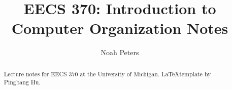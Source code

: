\documentclass[a4paper]{report}
\author{Noah Peters}
\title{EECS 370: Introduction to Computer Organization Notes}
\begin{document}
\maketitle

\begin{abstract}
	Lecture notes for EECS 370 at the University of Michigan.
	\LaTeX   template by Pingbang Hu.
\end{abstract}

\newpage

\tableofcontents


\newpage
\appendix
\appendixpage



\newpage
\printbibliography
\end{document}
